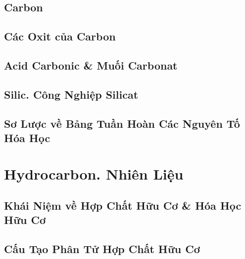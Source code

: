 \documentclass{article}
\numberwithin{equation}{section}
\begin{document}

\subsection{Carbon}


\subsection{Các Oxit của Carbon}


\subsection{Acid Carbonic \& Muối Carbonat}


\subsection{Silic. Công Nghiệp Silicat}


\subsection{Sơ Lược về Bảng Tuần Hoàn Các Nguyên Tố Hóa Học}


\section{Hydrocarbon. Nhiên Liệu}

\subsection{Khái Niệm về Hợp Chất Hữu Cơ \& Hóa Học Hữu Cơ}


\subsection{Cấu Tạo Phân Tử Hợp Chất Hữu Cơ}
\end{document}
